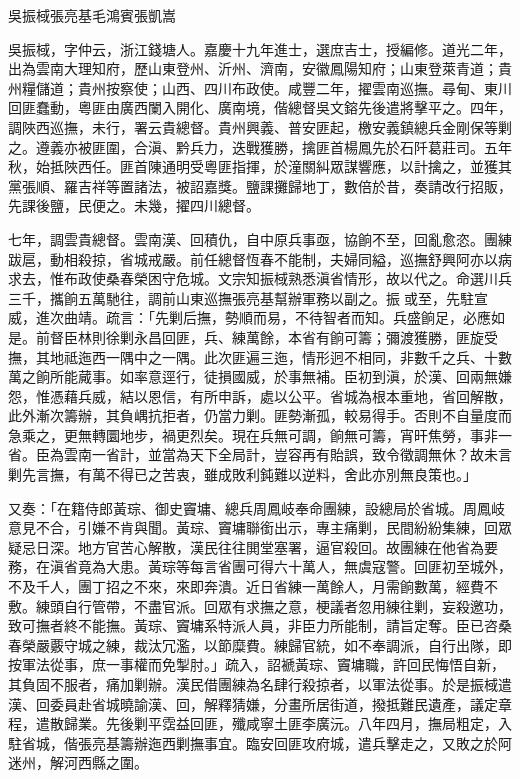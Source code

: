 
\begin{pinyinscope}
吳振棫張亮基毛鴻賓張凱嵩

吳振棫，字仲云，浙江錢塘人。嘉慶十九年進士，選庶吉士，授編修。道光二年，出為雲南大理知府，歷山東登州、沂州、濟南，安徽鳳陽知府；山東登萊青道；貴州糧儲道；貴州按察使；山西、四川布政使。咸豐二年，擢雲南巡撫。尋甸、東川回匪蠢動，粵匪由廣西闌入開化、廣南境，偕總督吳文鎔先後遣將擊平之。四年，調陜西巡撫，未行，署云貴總督。貴州興義、普安匪起，檄安義鎮總兵金剛保等剿之。遵義亦被匪圍，合滇、黔兵力，迭戰獲勝，擒匪首楊鳳先於石阡葛莊司。五年秋，始抵陜西任。匪首陳通明受粵匪指揮，於潼關糾眾謀響應，以計擒之，並獲其黨張順、羅吉祥等置諸法，被詔嘉獎。鹽課攤歸地丁，數倍於昔，奏請改行招販，先課後鹽，民便之。未幾，擢四川總督。

七年，調雲貴總督。雲南漢、回積仇，自中原兵事亟，協餉不至，回亂愈恣。團練跋扈，動相殺掠，省城戒嚴。前任總督恆春不能制，夫婦同縊，巡撫舒興阿亦以病求去，惟布政使桑春榮困守危城。文宗知振棫熟悉滇省情形，故以代之。命選川兵三千，攜餉五萬馳往，調前山東巡撫張亮基幫辦軍務以副之。振或至，先駐宣威，進次曲靖。疏言：「先剿后撫，勢順而易，不待智者而知。兵盛餉足，必應如是。前督臣林則徐剿永昌回匪，兵、練萬餘，本省有餉可籌；彌渡獲勝，匪旋受撫，其地祗迤西一隅中之一隅。此次匪遍三迤，情形迥不相同，非數千之兵、十數萬之餉所能蕆事。如率意逕行，徒損國威，於事無補。臣初到滇，於漢、回兩無嫌怨，惟憑藉兵威，結以恩信，有所申訴，處以公平。省城為根本重地，省回解散，此外漸次籌辦，其負嵎抗拒者，仍當力剿。匪勢漸孤，較易得手。否則不自量度而急乘之，更無轉圜地步，禍更烈矣。現在兵無可調，餉無可籌，宵旰焦勞，事非一省。臣為雲南一省計，並當為天下全局計，豈容再有貽誤，致令徵調無休？故未言剿先言撫，有萬不得已之苦衷，雖成敗利鈍難以逆料，舍此亦別無良策也。」

又奏：「在籍侍郎黃琮、御史竇墉、總兵周鳳岐奉命團練，設總局於省城。周鳳岐意見不合，引嫌不肯與聞。黃琮、竇墉聯銜出示，專主痛剿，民間紛紛集練，回眾疑忌日深。地方官苦心解散，漢民往往閧堂塞署，逼官殺回。故團練在他省為要務，在滇省竟為大患。黃琮等每言省團可得六十萬人，無虞寇警。回匪初至城外，不及千人，團丁招之不來，來即奔潰。近日省練一萬餘人，月需餉數萬，經費不敷。練頭自行管帶，不盡官派。回眾有求撫之意，梗議者忽用練往剿，妄殺邀功，致可撫者終不能撫。黃琮、竇墉系特派人員，非臣力所能制，請旨定奪。臣已咨桑春榮嚴覈守城之練，裁汰冗濫，以節糜費。練歸官統，如不奉調派，自行出隊，即按軍法從事，庶一事權而免掣肘。」疏入，詔褫黃琮、竇墉職，許回民悔悟自新，其負固不服者，痛加剿辦。漢民借團練為名肆行殺掠者，以軍法從事。於是振棫遣漢、回委員赴省城曉諭漢、回，解釋猜嫌，分畫所居街道，撥抵難民遺產，議定章程，遣散歸業。先後剿平霑益回匪，殲咸寧土匪李廣沅。八年四月，撫局粗定，入駐省城，偕張亮基籌辦迤西剿撫事宜。臨安回匪攻府城，遣兵擊走之，又敗之於阿迷州，解河西縣之圍。


\end{pinyinscope}
